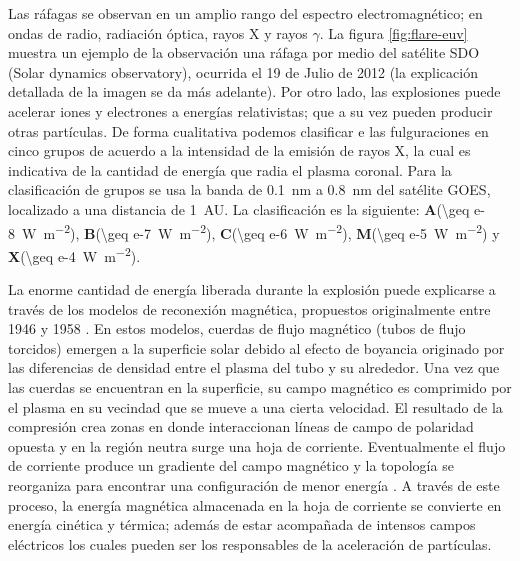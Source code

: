 Las ráfagas se observan en un amplio rango del espectro electromagnético; en ondas de radio, radiación óptica, rayos X y rayos $\gamma$. La figura \ref{fig:flare-euv} muestra un ejemplo de la observación una ráfaga por medio del satélite SDO (Solar dynamics observatory), ocurrida el \num{19} de Julio de \num{2012} (la explicación detallada de la imagen se da más adelante). Por otro lado, las explosiones puede acelerar iones y electrones a energías relativistas; que a su vez pueden producir otras partículas. De forma cualitativa podemos clasificar e las fulguraciones en cinco grupos de acuerdo a la intensidad de la emisión de rayos X, la cual es indicativa de la cantidad de energía que radia el plasma coronal. Para la clasificación de grupos se usa la banda de \SI{0.1}{\nano\metre} a \SI{0.8}{\nano\metre} del satélite GOES, localizado a una distancia de \SI{1}{AU}. La clasificación es la siguiente: \textbf{A}(\SI{\geq e-8}{\watt\per\square\metre}), \textbf{B}(\SI{\geq e-7}{\watt\per\square\metre}), \textbf{C}(\SI{\geq e-6}{\watt\per\square\metre}), \textbf{M}(\SI{\geq e-5}{\watt\per\square\metre}) y \textbf{X}(\SI{\geq e-4}{\watt\per\square\metre}).

La enorme cantidad de energía liberada durante la explosión puede explicarse a través de los modelos de reconexión magnética, propuestos originalmente entre \num{1946} y \num{1958} \cite{giovanelli,hoyle,sweet,parker}. En estos modelos, cuerdas de flujo magnético (tubos de flujo torcidos) emergen a la superficie solar debido al efecto de boyancia originado por las diferencias de densidad entre el plasma del tubo y su alrededor. Una vez que las cuerdas se encuentran en la superficie, su campo magnético es comprimido por el plasma en su vecindad que se mueve a una cierta velocidad. El resultado de la compresión crea zonas en donde interaccionan líneas de campo de polaridad opuesta y en la región neutra surge una hoja de corriente. Eventualmente el flujo de corriente produce un gradiente del campo magnético y la topología se reorganiza para encontrar una configuración de menor energía \cite{shiba11}. A través de este proceso, la energía magnética almacenada en la hoja de corriente se convierte en energía cinética y térmica; además de estar acompañada de intensos campos eléctricos los cuales pueden ser los responsables de la aceleración de partículas.

